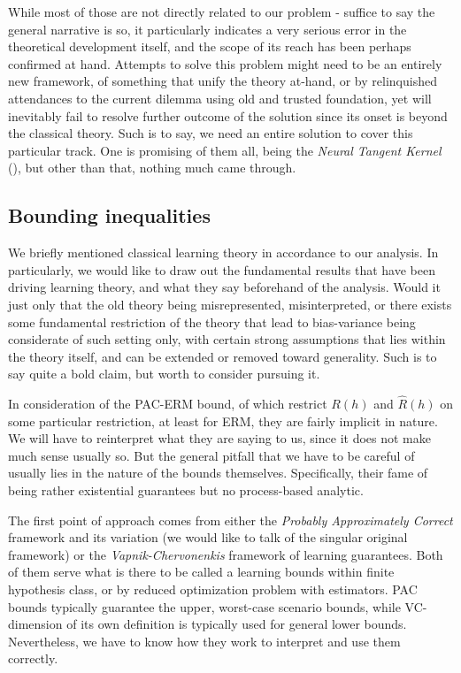 \documentclass[10pt]{article} %
\begin{document}
While most of those are not directly related to our problem - suffice to say the general narrative is so, it particularly indicates a very serious error in the theoretical development itself, and the scope of its reach has been perhaps confirmed at hand. Attempts to solve this problem might need to be an entirely new framework, of something that unify the theory at-hand, or by relinquished attendances to the current dilemma using old and trusted foundation, yet will inevitably fail to resolve further outcome of the solution since its onset is beyond the classical theory. Such is to say, we need an entire solution to cover this particular track. One is promising of them all, being the \textit{Neural Tangent Kernel} (\cite{Jacot:2018:NTK}), but other than that, nothing much came through. 

\subsection{Bounding inequalities}

We briefly mentioned classical learning theory in accordance to our analysis. In particularly, we would like to draw out the fundamental results that have been driving learning theory, and what they say beforehand of the analysis. Would it just only that the old theory being misrepresented, misinterpreted, or there exists some fundamental restriction of the theory that lead to bias-variance being considerate of such setting only, with certain strong assumptions that lies within the theory itself, and can be extended or removed toward generality. Such is to say quite a bold claim, but worth to consider pursuing it. 

In consideration of the PAC-ERM bound, of which restrict $R(h)$ and $\hat{R}(h)$ on some particular restriction, at least for ERM, they are fairly implicit in nature. We will have to reinterpret what they are saying to us, since it does not make much sense usually so. But the general pitfall that we have to be careful of usually lies in the nature of the bounds themselves. Specifically, their fame of being rather existential guarantees but no process-based analytic. 

The first point of approach comes from either the \textit{Probably Approximately Correct} framework and its variation (we would like to talk of the singular original framework) or the \textit{Vapnik-Chervonenkis} framework of learning guarantees. Both of them serve what is there to be called a learning bounds within finite hypothesis class, or by reduced optimization problem with estimators. PAC bounds typically guarantee the upper, worst-case scenario bounds, while VC-dimension of its own definition is typically used for general lower bounds. Nevertheless, we have to know how they work to interpret and use them correctly.
\end{document}
